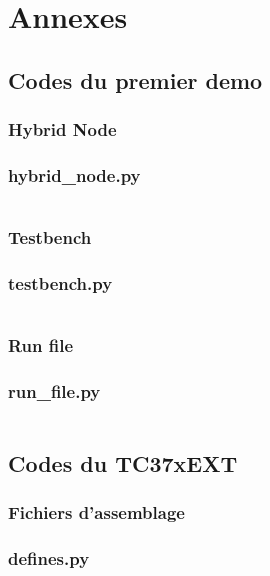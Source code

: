 \section{Annexes}
\subsection{Codes du premier demo}

\subsubsection{Hybrid Node}
\label{anexe:first_demo:hybrid_node}
\subsubsection*{hybrid\_node.py}
\inputminted[autogobble]{python}{anexes/first_demo/hybrid_node.py}

\subsubsection{Testbench}
\label{anexe:first_demo:testbench}
\subsubsection*{testbench.py}
\inputminted[autogobble]{python}{anexes/first_demo/testbench.py}

\subsubsection{Run file}
\label{anexe:first_demo:run_file}
\subsubsection*{run\_file.py}
\inputminted[autogobble]{python}{anexes/first_demo/run_microsar.py}

\subsection{Codes du TC37xEXT}
\label{anexe:tc37ex}

\subsubsection{Fichiers d'assemblage}
\label{anexe:tc37ex:assembly}
\subsubsection*{defines.py}
\label{anexe:tc37ex:defines}
\inputminted[autogobble]{python}{anexes/tc37ex/defines.py}


